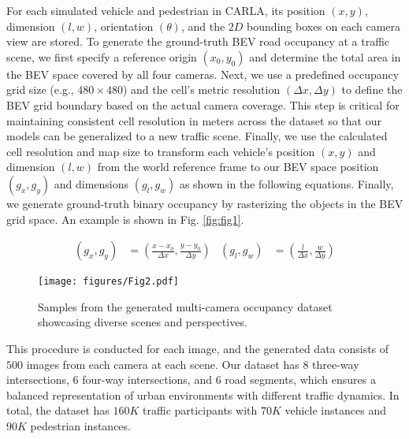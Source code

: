 For each simulated vehicle and pedestrian in CARLA, its position $(x, y)$, dimension $(l, w)$, orientation $(\theta)$, and the $2D$ bounding boxes on each camera view are stored.
To generate the ground-truth BEV road occupancy at a traffic scene, we first specify a reference origin $(x_0,y_0)$ and determine the total area in the BEV space covered by all four cameras. Next, we use a predefined occupancy grid size (e.g., $480\times480$) and the cell's metric resolution $(\Delta x, \Delta y)$ to define the BEV grid boundary based on the actual camera coverage. This step is critical for maintaining consistent cell resolution in meters across the dataset so that our models can be generalized to a new traffic scene. Finally, we use the calculated cell resolution and map size to transform each vehicle's position $(x, y)$ and dimension $(l, w)$ from the world reference frame to our BEV space position $(g_x, g_y)$ and dimensions $(g_l, g_w)$ as shown in the following equations. Finally, we generate ground-truth binary occupancy by rasterizing the objects in the BEV grid space. An example is shown in Fig. \ref{fig:fig1}.

\begin{align}
\label{eq:grid_generation}
    (g_x, g_y) &= (\frac{x - x_0}{\Delta x}, \frac{y - y_0}{\Delta y}) &
    (g_l, g_w) &= (\frac{l}{\Delta x}, \frac{w}{\Delta y})    
\end{align}

\begin{figure}[t]
    \centering
    \texttt{[image: figures/Fig2.pdf]}
    \caption{Samples from the generated multi-camera occupancy dataset showcasing diverse scenes and perspectives.}
    \label{fig:fig2}
\vspace{-0.4in}
\end{figure}

This procedure is conducted for each image, and the generated data consists of $500$ images from each camera at each scene. Our dataset has 8 three-way intersections, 6 four-way intersections, and 6 road segments, which ensures a balanced representation of urban environments with different traffic dynamics. In total, the dataset has $160K$ traffic participants with $70K$ vehicle instances and $90K$ pedestrian instances.  

